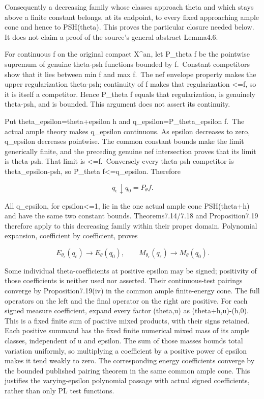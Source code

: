\documentclass[
]{article}
\begin{document}
Consequently a decreasing family whose classes approach theta and which
stays above a finite constant belongs, at its endpoint, to every fixed
approaching ample cone and hence to PSH(theta). This proves the
particular closure needed below. It does not claim a proof of the
source's general abstract Lemma4.6.

For continuous f on the original compact X\^{}an, let P\_theta f be the
pointwise supremum of genuine theta-psh functions bounded by f.~Constant
competitors show that it lies between min f and max f.~The nef envelope
property makes the upper regularization theta-psh; continuity of f makes
that regularization \textless=f, so it is itself a competitor. Hence
P\_theta f equals that regularization, is genuinely theta-psh, and is
bounded. This argument does not assert its continuity.

Put theta\_epsilon=theta+epsilon h and q\_epsilon=P\_theta\_epsilon
f.~The actual ample theory makes q\_epsilon continuous. As epsilon
decreases to zero, q\_epsilon decreases pointwise. The common constant
bounds make the limit generically finite, and the preceding genuine nef
intersection proves that its limit is theta-psh. That limit is
\textless=f.~Conversely every theta-psh competitor is
theta\_epsilon-psh, so P\_theta f\textless=q\_epsilon. Therefore

\[q_\epsilon\downarrow q_0=P_\theta f.\]

All q\_epsilon, for epsilon\textless=1, lie in the one actual ample cone
PSH(theta+h) and have the same two constant bounds. Theorems7.14/7.18
and Proposition7.19 therefore apply to this decreasing family within
their proper domain. Polynomial expansion, coefficient by coefficient,
proves

\[E_{\theta_\epsilon}(q_\epsilon)\longrightarrow E_\theta(q_0),\qquad
M_{\theta_\epsilon}(q_\epsilon)\longrightarrow M_\theta(q_0).\]

Some individual theta-coefficients at positive epsilon may be signed;
positivity of those coefficients is neither used nor asserted. Their
continuous-test pairings converge by Proposition7.19(iv) in the common
ample finite-energy cone. The full operators on the left and the final
operator on the right are positive. For each signed measure coefficient,
expand every factor (theta,u) as (theta+h,u)-(h,0). This is a fixed
finite sum of positive mixed products, with their signs retained. Each
positive summand has the fixed finite numerical mixed mass of its ample
classes, independent of u and epsilon. The sum of those masses bounds
total variation uniformly, so multiplying a coefficient by a positive
power of epsilon makes it tend weakly to zero. The corresponding energy
coefficients converge by the bounded published pairing theorem in the
same common ample cone. This justifies the varying-epsilon polynomial
passage with actual signed coefficients, rather than only PL test
functions.
\end{document}
